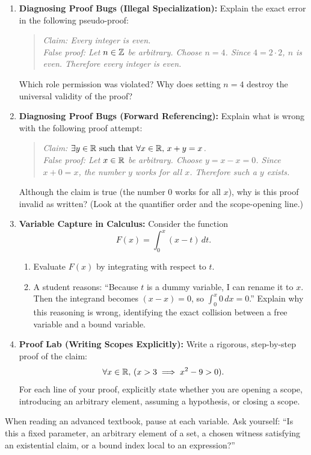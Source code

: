 \begin{enumerate}
\item \textbf{Diagnosing Proof Bugs (Illegal Specialization):} Explain the exact error in the following pseudo-proof:
\begin{quote}
\itshape Claim: Every integer is even.\\
False proof: Let $n \in \mathbb{Z}$ be arbitrary. Choose $n = 4$. Since $4 = 2 \cdot 2$, $n$ is even. Therefore every integer is even.
\end{quote}
Which role permission was violated? Why does setting $n = 4$ destroy the universal validity of the proof?

\item \textbf{Diagnosing Proof Bugs (Forward Referencing):} Explain what is wrong with the following proof attempt:
\begin{quote}
\itshape Claim: $\exists y \in \mathbb{R} \text{ such that } \forall x \in \mathbb{R}, \, x + y = x$.\\
False proof: Let $x \in \mathbb{R}$ be arbitrary. Choose $y = x - x = 0$. Since $x + 0 = x$, the number $y$ works for all $x$. Therefore such a $y$ exists.
\end{quote}
Although the claim is true (the number $0$ works for all $x$), why is this proof invalid as written? (Look at the quantifier order and the scope-opening line.)

\item \textbf{Variable Capture in Calculus:} Consider the function
\[
F(x) = \int_0^x (x - t) \, dt.
\]
\begin{enumerate}[label=(\alph*)]
\item Evaluate $F(x)$ by integrating with respect to $t$.
\item A student reasons: ``Because $t$ is a dummy variable, I can rename it to $x$. Then the integrand becomes $(x - x) = 0$, so $\int_0^x 0 \, dx = 0$.'' Explain why this reasoning is wrong, identifying the exact collision between a free variable and a bound variable.
\end{enumerate}

\item \textbf{Proof Lab (Writing Scopes Explicitly):} Write a rigorous, step-by-step proof of the claim:
\[
\forall x \in \mathbb{R}, \, (x > 3 \implies x^2 - 9 > 0).
\]
For each line of your proof, explicitly state whether you are opening a scope, introducing an arbitrary element, assuming a hypothesis, or closing a scope.
\end{enumerate}

\begin{walkbox}
When reading an advanced textbook, pause at each variable. Ask yourself: ``Is this a fixed parameter, an arbitrary element of a set, a chosen witness satisfying an existential claim, or a bound index local to an expression?''
\end{walkbox}

\newpage
